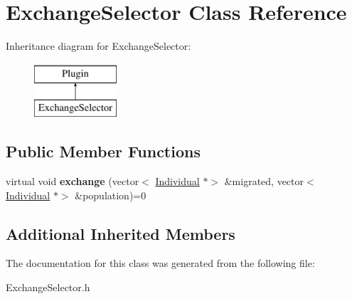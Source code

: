 \hypertarget{classExchangeSelector}{}\section{Exchange\+Selector Class Reference}
\label{classExchangeSelector}
Inheritance diagram for Exchange\+Selector\+:\begin{figure}[H]
\begin{center}
\leavevmode
\includegraphics[height=2.000000cm]{d7/da5/classExchangeSelector}
\end{center}
\end{figure}
\subsection*{Public Member Functions}
\begin{DoxyCompactItemize}
\item 
\mbox{\label{classExchangeSelector_aaa310ac479ff8a3419e8f2b43e37b5af}} 
virtual void {\bfseries exchange} (vector$<$ \mbox{\hyperlink{classIndividual}{Individual}} $\ast$$>$ \&migrated, vector$<$ \mbox{\hyperlink{classIndividual}{Individual}} $\ast$$>$ \&population)=0
\end{DoxyCompactItemize}
\subsection*{Additional Inherited Members}


The documentation for this class was generated from the following file\+:\begin{DoxyCompactItemize}
\item 
Exchange\+Selector.\+h\end{DoxyCompactItemize}
